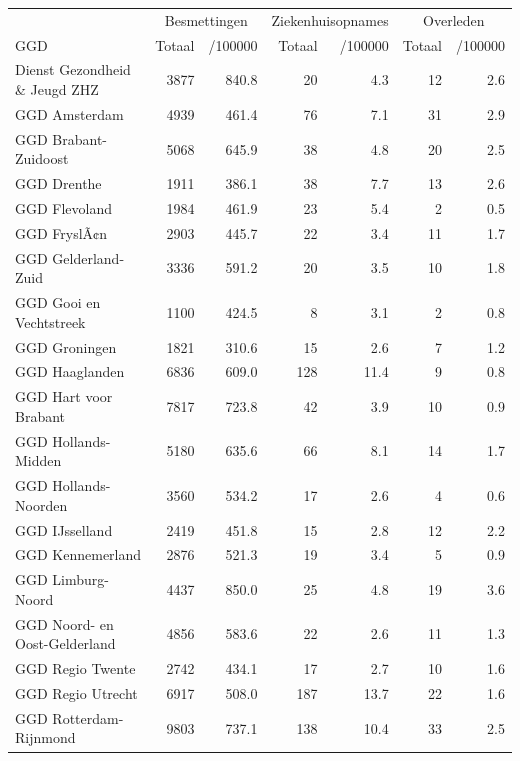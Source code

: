 \documentclass[
  english,
  man,floatsintext]{apa6}
\begin{document}
\begin{table}
\centering\begingroup\fontsize{10}{12}\selectfont

\begin{threeparttable}
\begin{tabular}{lrrrrrr}
\toprule
\multicolumn{1}{c}{ } & \multicolumn{2}{c}{Besmettingen} & \multicolumn{2}{c}{Ziekenhuisopnames} & \multicolumn{2}{c}{Overleden} \\
\cmidrule(l{3pt}r{3pt}){2-3} \cmidrule(l{3pt}r{3pt}){4-5} \cmidrule(l{3pt}r{3pt}){6-7}
GGD & Totaal & /100000 & Totaal & /100000 & Totaal & /100000\\
\midrule
Dienst Gezondheid \& Jeugd ZHZ & 3877 & 840.8 & 20 & 4.3 & 12 & 2.6\\
GGD Amsterdam & 4939 & 461.4 & 76 & 7.1 & 31 & 2.9\\
GGD Brabant-Zuidoost & 5068 & 645.9 & 38 & 4.8 & 20 & 2.5\\
GGD Drenthe & 1911 & 386.1 & 38 & 7.7 & 13 & 2.6\\
GGD Flevoland & 1984 & 461.9 & 23 & 5.4 & 2 & 0.5\\
GGD FryslÃ¢n & 2903 & 445.7 & 22 & 3.4 & 11 & 1.7\\
GGD Gelderland-Zuid & 3336 & 591.2 & 20 & 3.5 & 10 & 1.8\\
GGD Gooi en Vechtstreek & 1100 & 424.5 & 8 & 3.1 & 2 & 0.8\\
GGD Groningen & 1821 & 310.6 & 15 & 2.6 & 7 & 1.2\\
GGD Haaglanden & 6836 & 609.0 & 128 & 11.4 & 9 & 0.8\\
GGD Hart voor Brabant & 7817 & 723.8 & 42 & 3.9 & 10 & 0.9\\
GGD Hollands-Midden & 5180 & 635.6 & 66 & 8.1 & 14 & 1.7\\
GGD Hollands-Noorden & 3560 & 534.2 & 17 & 2.6 & 4 & 0.6\\
GGD IJsselland & 2419 & 451.8 & 15 & 2.8 & 12 & 2.2\\
GGD Kennemerland & 2876 & 521.3 & 19 & 3.4 & 5 & 0.9\\
GGD Limburg-Noord & 4437 & 850.0 & 25 & 4.8 & 19 & 3.6\\
GGD Noord- en Oost-Gelderland & 4856 & 583.6 & 22 & 2.6 & 11 & 1.3\\
GGD Regio Twente & 2742 & 434.1 & 17 & 2.7 & 10 & 1.6\\
GGD Regio Utrecht & 6917 & 508.0 & 187 & 13.7 & 22 & 1.6\\
GGD Rotterdam-Rijnmond & 9803 & 737.1 & 138 & 10.4 & 33 & 2.5\\

\end{tabular}
\end{threeparttable}
\end{table}
\end{document}
